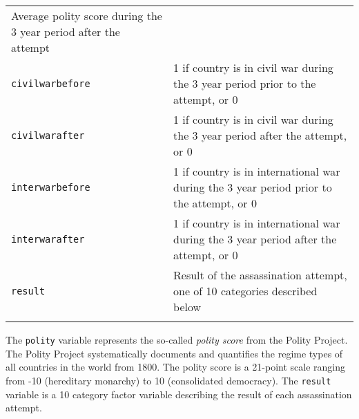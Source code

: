 \documentclass[]{article}
\begin{document}
\begin{longtable}[c]{@{}ll@{}}
\begin{minipage}[t]{0.68\columnwidth}
Average polity score during the 3 year period after the attempt
\end{minipage}
\\\addlinespace
\begin{minipage}[t]{0.25\columnwidth}\raggedright
\texttt{civilwarbefore}
\end{minipage} & \begin{minipage}[t]{0.68\columnwidth}\raggedright
1 if country is in civil war during the 3 year period prior to the
attempt, or 0
\end{minipage}
\\\addlinespace
\begin{minipage}[t]{0.25\columnwidth}\raggedright
\texttt{civilwarafter}
\end{minipage} & \begin{minipage}[t]{0.68\columnwidth}\raggedright
1 if country is in civil war during the 3 year period after the attempt,
or 0
\end{minipage}
\\\addlinespace
\begin{minipage}[t]{0.25\columnwidth}\raggedright
\texttt{interwarbefore}
\end{minipage} & \begin{minipage}[t]{0.68\columnwidth}\raggedright
1 if country is in international war during the 3 year period prior to
the attempt, or 0
\end{minipage}
\\\addlinespace
\begin{minipage}[t]{0.25\columnwidth}\raggedright
\texttt{interwarafter}
\end{minipage} & \begin{minipage}[t]{0.68\columnwidth}\raggedright
1 if country is in international war during the 3 year period after the
attempt, or 0
\end{minipage}
\\\addlinespace
\begin{minipage}[t]{0.25\columnwidth}\raggedright
\texttt{result}
\end{minipage} & \begin{minipage}[t]{0.68\columnwidth}\raggedright
Result of the assassination attempt, one of 10 categories described
below
\end{minipage}
\\\addlinespace
\bottomrule
\end{longtable}

The \texttt{polity} variable represents the so-called \emph{polity
score} from the Polity Project. The Polity Project systematically
documents and quantifies the regime types of all countries in the world
from 1800. The polity score is a 21-point scale ranging from -10
(hereditary monarchy) to 10 (consolidated democracy). The
\texttt{result} variable is a 10 category factor variable describing the
result of each assassination attempt.
\end{document}
